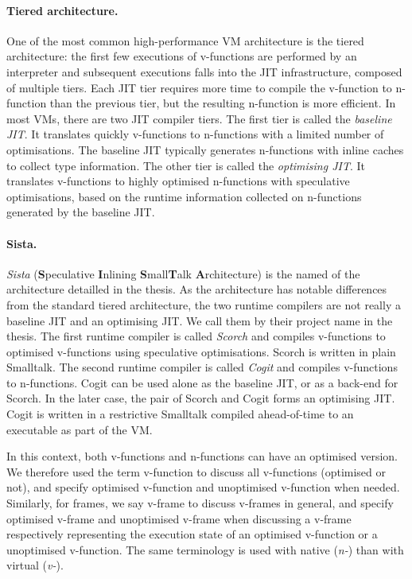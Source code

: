 \documentclass[a4paper,12pt,twoside]{../includes/ThesisStyle}
\begin{document}
\paragraph{Tiered architecture.} One of the most common high-performance VM architecture is the tiered architecture: the first few executions of v-functions are performed by an interpreter and subsequent executions falls into the JIT infrastructure, composed of multiple tiers. Each JIT tier requires more time to compile the v-function to n-function than the previous tier, but the resulting n-function is more efficient. In most VMs, there are two JIT compiler tiers. The first tier is called the \emph{baseline JIT}. It translates quickly v-functions to n-functions with a limited number of optimisations. The baseline JIT typically generates n-functions with inline caches to collect type information. The other tier is called the \emph{optimising JIT}. It translates v-functions to highly optimised n-functions with speculative optimisations, based on the runtime information collected on n-functions generated by the baseline JIT.

\paragraph{Sista.} \emph{Sista} (\textbf{S}peculative \textbf{I}nlining \textbf{S}mall\textbf{T}alk \textbf{A}rchitecture) is the named of the architecture detailled in the thesis. As the architecture has notable differences from the standard tiered architecture, the two runtime compilers are not really a baseline JIT and an optimising JIT. We call them by their project name in the thesis. The first runtime compiler is called \emph{Scorch} and compiles v-functions to optimised v-functions using speculative optimisations. Scorch is written in plain Smalltalk. The second runtime compiler is called \emph{Cogit} and compiles v-functions to n-functions. Cogit can be used alone as the baseline JIT, or as a back-end for Scorch. In the later case, the pair of Scorch and Cogit forms an optimising JIT. Cogit is written in a restrictive Smalltalk compiled ahead-of-time to an executable as part of the VM.

In this context, both v-functions and n-functions can have an optimised version. We therefore used the term v-function to discuss all v-functions (optimised or not), and specify optimised v-function and unoptimised v-function when needed. Similarly, for frames, we say v-frame to discuss v-frames in general, and specify optimised v-frame and unoptimised v-frame when discussing a v-frame respectively representing the execution state of an optimised v-function or a unoptimised v-function. The same terminology is used with native (\emph{n-}) than with virtual (\emph{v-}).
\end{document}
